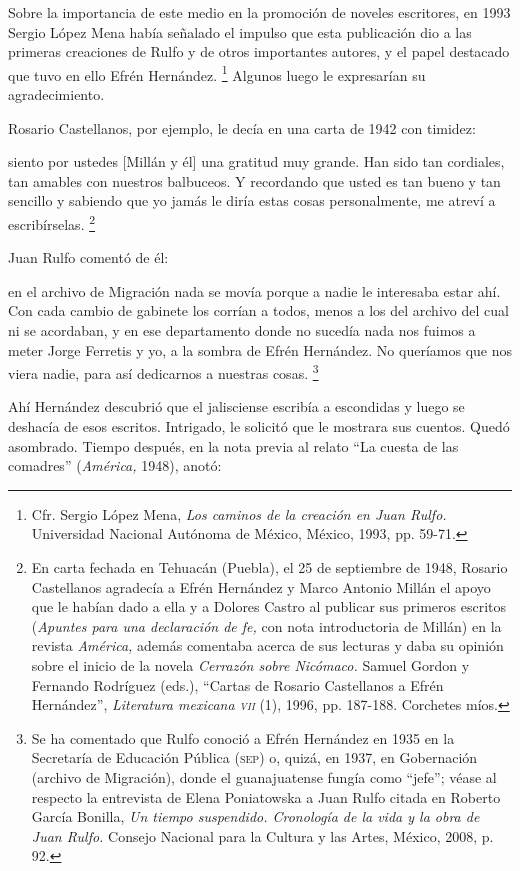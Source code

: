 \documentclass[14pt,twoside,final]{extbook} %
\let\oldfootnote\footnote
\renewcommand\footnote[1]{%
\oldfootnote{\hspace{1mm}#1}}
\begin{document}
Sobre la importancia de este medio en la promoción de noveles escritores, en 1993 Sergio López Mena había señalado el impulso que esta publicación dio a las primeras creaciones de Rulfo y de otros importantes autores, y el papel destacado que tuvo en ello Efrén Hernández.\footnote{Cfr. Sergio López Mena, \emph{Los caminos de la creación en Juan Rulfo.} Universidad Nacional Autónoma de México, México, 1993, pp. 59-71.} Algunos luego le expresarían su agradecimiento.

Rosario Castellanos, por ejemplo, le decía en una carta de 1942 con timidez:
\begin{quoting}
siento por ustedes [Millán y él] una gratitud muy grande. Han sido tan cordiales, tan amables con nuestros balbuceos. Y recordando que usted es tan bueno y tan sencillo y sabiendo que yo jamás le diría estas cosas personalmente, me atreví a escribírselas.\footnote{En carta fechada en Tehuacán (Puebla), el 25 de septiembre de 1948, Rosario Castellanos agradecía a Efrén Hernández y Marco Antonio Millán el apoyo que le habían dado a ella y a Dolores Castro al publicar sus primeros escritos (\emph{Apuntes para una declaración de fe,} con nota introductoria de Millán) en la revista \emph{América,} además comentaba acerca de sus lecturas y daba su opinión sobre el inicio de la novela \emph{Cerrazón sobre Nicómaco.} Samuel Gordon y Fernando Rodríguez (eds.), ``Cartas de Rosario Castellanos a Efrén Hernández'', \emph{Literatura mexicana \textsc{vii}} (1), 1996, pp. 187-188. Corchetes míos.}
\end{quoting}
Juan Rulfo comentó de él: 
\begin{quoting}
en el archivo de Migración nada se movía porque a nadie le interesaba estar ahí. Con cada cambio de gabinete los corrían a todos, menos a los del archivo del cual ni se acordaban, y en ese departamento donde no sucedía nada nos fuimos a meter Jorge Ferretis y yo, a la sombra de Efrén Hernández. No queríamos que nos viera nadie, para así dedicarnos a nuestras cosas.\footnote{Se ha comentado que Rulfo conoció a Efrén Hernández en 1935 en la Secretaría de Educación Pública (\textsc{sep}) o, quizá, en 1937, en Gobernación (archivo de Migración), donde el guanajuatense fungía como ``jefe''; véase al respecto la entrevista de Elena Poniatowska a Juan Rulfo citada en Roberto García Bonilla, \emph{Un tiempo suspendido. Cronología de la vida y la obra de Juan Rulfo.} Consejo Nacional para la Cultura y las Artes, México, 2008, p. 92.}
\end{quoting}
Ahí Hernández descubrió que el jalisciense escribía a escondidas y luego se deshacía de esos escritos. Intrigado, le solicitó que le mostrara sus cuentos. Quedó asombrado. Tiempo después, en la nota previa al relato ``La cuesta de las comadres'' (\emph{América,} 1948), anotó:
\end{document}
